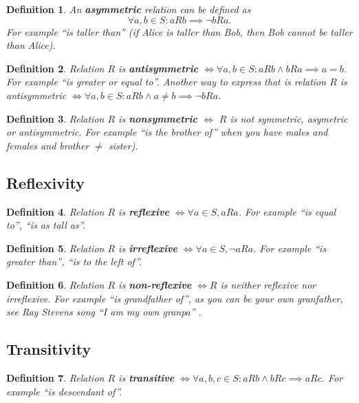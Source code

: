 \documentclass[11pt]{article}
\theoremstyle{plain}
\newtheorem{defn}{Definition}
\theoremstyle{definition}
\begin{document}
\begin{defn}
  An \textbf{asymmetric} relation can be defined as
  \[ \forall a, b \in S: aRb \implies \neg bRa .\]
  For example ``is taller than'' (if Alice is taller than Bob, then Bob cannot be taller than Alice).
\end{defn}

\begin{defn}
  Relation $R$ is \textbf{antisymmetric} $\iff \forall a, b \in S: aRb \land bRa \implies a = b$.
  For example ``is greater or equal to''.
  Another way to express that is relation $R$ is antisymmetric $\iff \forall a, b \in S: aRb \land a \neq b \implies \neg bRa$.
\end{defn}

\begin{defn}
  Relation $R$ is \textbf{nonsymmetric} $\iff$ $R$ is not symmetric, asymetric or antisymmetric.
  For example ``is the brother of'' when you have males and females and brother $\neq$ sister).
\end{defn}

\subsection{Reflexivity}

\begin{defn}
  Relation $R$ is \textbf{reflexive} $\iff \forall a \in S, aRa$.
  For example ``is equal to'', ``is as tall as''.
\end{defn}

\begin{defn}
  Relation $R$ is \textbf{irreflexive} $\iff \forall a \in S, \neg aRa$.
  For example ``is greater than'', ``is to the left of''.
\end{defn}

\begin{defn}
  Relation $R$ is \textbf{non-reflexive} $\iff R$ is neither reflexive nor irreflexive.
  For example ``is grandfather of'', as you can be your own granfather,
  see Ray Stevens song ``I am my own granpa'' \smiley.
\end{defn}

\subsection{Transitivity}

\begin{defn}
  Relation $R$ is \textbf{transitive} $\iff \forall a, b, c \in S: aRb \land bRc \implies aRc$.
  For example ``is descendant of''.
\end{defn}
\end{document}
